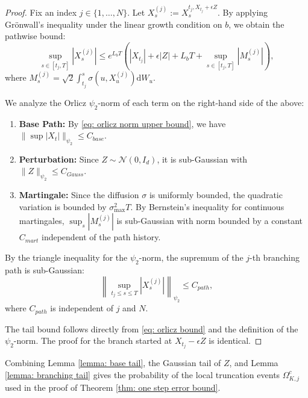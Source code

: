 \documentclass[twoside,11pt]{article}
\newcommand{\1}{\mathbf{1}}
\numberwithin{equation}{section}
\begin{document}
\begin{proof}
    Fix an index $j \in \{1, \dots, N\}$. Let $X_s^{(j)} := X_s^{t_j, X_{t_j} + \epsilon Z}$. By applying Grönwall's inequality under the linear growth condition on $b$, we obtain the pathwise bound:
    \begin{equation}
        \sup_{s \in [t_j, T]} |X_s^{(j)}| \le e^{L_b T} \left( |X_{t_j}| + \epsilon |Z| + L_b T + \sup_{s \in [t_j, T]} |M_s^{(j)}| \right),
    \end{equation}
    where $M_s^{(j)} = \sqrt{2}\int_{t_j}^s \sigma(u, X_u^{(j)}) \mathrm{d}W_u$.

    We analyze the Orlicz $\psi_2$-norm of each term on the right-hand side of the above:
    \begin{enumerate}
        \item \textbf{Base Path:} By \eqref{eq: orlicz norm upper bound}, we have $\|\sup |X_t|\|_{\psi_2} \le C_{base}$.
        \item \textbf{Perturbation:} Since $Z \sim \mathcal{N}(0, I_d)$, it is sub-Gaussian with $\|Z\|_{\psi_2} \le C_{Gauss}$.
        \item \textbf{Martingale:} Since the diffusion $\sigma$ is uniformly bounded, the quadratic variation is bounded by $\sigma_{\max}^2 T$. By Bernstein's inequality for continuous martingales, $\sup_{s} |M_s^{(j)}|$ is sub-Gaussian with norm bounded by a constant $C_{mart}$ independent of the path history.
    \end{enumerate}
    By the triangle inequality for the $\psi_2$-norm, the supremum of the $j$-th branching path is sub-Gaussian:
    \begin{equation}\label{eq: orlicz bound}
        \left\| \sup_{t_j \le s \le T} |X_s^{(j)}| \right\|_{\psi_2} \le C_{path},
    \end{equation}
    where $C_{path}$ is independent of $j$ and $N$.

    The tail bound follows directly from \eqref{eq: orlicz bound} and
    the definition of the $\psi_2$-norm. The proof for the branch started at
    $X_{t_j}-\epsilon Z$ is identical.
\end{proof}

Combining Lemma \ref{lemma: base tail}, the Gaussian tail of $Z$, and Lemma
\ref{lemma: branching tail} gives the probability of  the local truncation events
$\Omega_{K,j}^c$ used in the proof of Theorem \ref{thm: one step error bound}.
\end{document}
